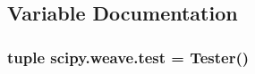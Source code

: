 \subsection{Variable Documentation}
\hypertarget{namespacescipy_1_1weave_a904d48ea68578c1d6a80c0fd080d04df}{}
\subsubsection[{test}]{\setlength{\rightskip}{0pt plus 5cm}tuple scipy.\+weave.\+test = Tester()}\label{namespacescipy_1_1weave_a904d48ea68578c1d6a80c0fd080d04df}
